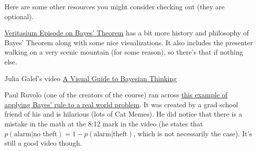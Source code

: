 \documentclass[assignment01_Solutions]{subfiles}
\begin{document}
\begin{externalresources}[(60 minutes)]
 Here are some other resources you might consider checking out (they are optional).
\bi
\item \href{https://www.youtube.com/watch?v=R13BD8qKeTg}{Veritasium Episode on Bayes' Theorem} has a bit more history and philosophy of Bayes' Theorem along with some nice visualizations.  It also includes the presenter walking on a very scenic mountain (for some reason), so there's that if nothing else.
\item Julia Galef's video \href{https://www.youtube.com/watch?v=BrK7X_XlGB8}{A Visual Guide to Bayesian Thinking}
\item Paul Ruvolo (one of the creators of the course) ran across \href{https://youtube.com/watch?v=nvqXXlz-rx0}{this example of applying Bayes' rule to a real world problem}.  It was created by a grad school friend of his and is hilarious (lots of Cat Memes).  He did notice that there is a mistake in the math at the 8:12 mark in the video (he states that $p(\mbox{alarm} | \mbox{no theft}) = 1 - p(\mbox{alarm} | \mbox{theft})$, which is not necessarily the case).  It's still a good video though.
\ei

\end{externalresources}
\end{document}
